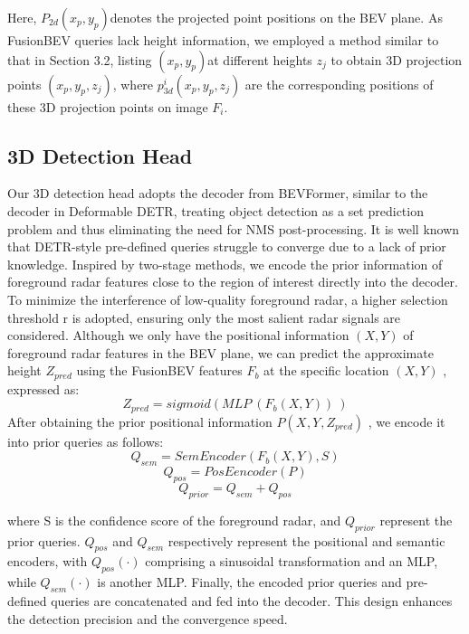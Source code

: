 \documentclass{article}
\begin{document}
Here, $P_{2d}(x_{p},y_{p})$denotes the projected point positions on the BEV plane. As FusionBEV queries lack height information, we employed a method similar to that in Section 3.2, listing $\left( x_{p},y_{p}\right)  $at different heights $z_{j}$ to obtain 3D projection points $(x_{p},y_{p},z_{j})$, where $p^{i}_{3d}(x_{p},y_{p},z_{j})$ are the corresponding positions of these 3D projection points on image $F_{i}$.



\subsection{3D Detection Head}
Our 3D detection head adopts the decoder from BEVFormer, similar to the decoder in Deformable DETR, treating object detection as a set prediction problem and thus eliminating the need for NMS post-processing. It is well known that DETR-style pre-defined queries struggle to converge due to a lack of prior knowledge. Inspired by two-stage methods, we encode the prior information of foreground radar features close to the region of interest directly into the decoder. To minimize the interference of low-quality foreground radar, a higher selection threshold r is adopted, ensuring only the most salient radar signals are considered.  Although we only have the positional information $\left( X,Y\right)$ of foreground radar features in the BEV plane, we can predict the approximate height $Z_{pred}$ using the FusionBEV features $F_{b}$ at the specific location $\left( X,Y\right) $ , expressed as:
$$Z^{}_{pred}=sigmoid(MLP\  (F_{b}(X,Y))\  )$$
After obtaining the prior positional information $P(X_{},Y_{},Z^{}_{pred})$ , we encode it into prior queries as follows:
$$Q_{sem}=SemEncoder\left( F_{b}(X,Y),S\right)  $$
$$Q_{pos}=PosEencoder\left( P\right)  $$
$$Q_{prior}=Q_{sem}+Q_{pos}$$

where S is the confidence score of the foreground radar, and $Q_{prior}$ represent the prior queries. $Q_{pos}$ and $Q_{sem}$ respectively represent the positional and semantic encoders,  with $Q_{pos}\left( \cdot \right) $ comprising a sinusoidal transformation and an MLP, while $Q_{sem}\left( \cdot \right) $ is another MLP. 
Finally, the encoded prior queries and pre-defined queries are concatenated and fed into the decoder. This design enhances the detection precision and the convergence speed.



\end{document}

